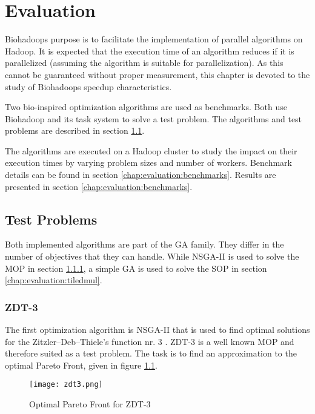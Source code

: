 \chapter{Evaluation}
\label{chap:evaluation}
Biohadoops purpose is to facilitate the implementation of parallel algorithms on Hadoop. It is expected that the execution time of an algorithm reduces if it is parallelized (assuming the algorithm is suitable for parallelization). As this cannot be guaranteed without proper measurement, this chapter is devoted to the study of Biohadoops speedup characteristics.

Two bio-inspired optimization algorithms are used as benchmarks. Both use Biohadoop and its task system to solve a test problem. The algorithms and test problems are described in section \ref{chap:evaluation:testproblems}.

The algorithms are executed on a Hadoop cluster to study the impact on their execution times by varying problem sizes and number of workers. Benchmark details can be found in section \ref{chap:evaluation:benchmarks}. Results are presented in section \ref{chap:evaluation:benchmarks}.

\section{Test Problems}
\label{chap:evaluation:testproblems}
Both implemented algorithms are part of the GA family. They differ in the number of objectives that they can handle. While NSGA-II is used to solve the MOP in section \ref{chap:evaluation:zdt3}, a simple GA is used to solve the SOP in section \ref{chap:evaluation:tiledmul}.

\subsection{ZDT-3}
\label{chap:evaluation:zdt3}
The first optimization algorithm is NSGA-II that is used to find optimal solutions for the Zitzler–Deb–Thiele's function nr. 3 \cite{zitzler2000comparison}. ZDT-3 is a well known MOP and therefore suited as a test problem. The task is to find an approximation to the optimal Pareto Front, given in figure \ref{fig:zdt3}.

\begin{figure}
  \centering
  \texttt{[image: zdt3.png]}
  \caption[Optimal Pareto Front for ZDT-3]{Optimal Pareto Front for ZDT-3}
  \label{fig:zdt3}
\end{figure}

